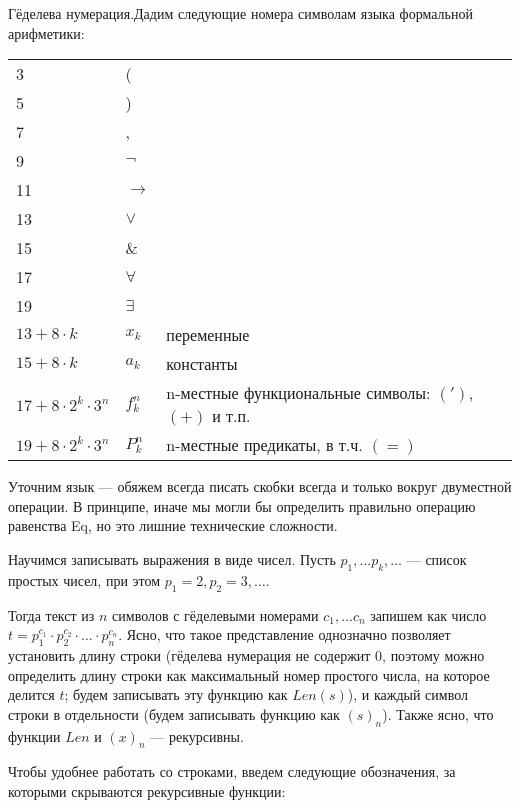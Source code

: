 \begin{definition}{Гёделева нумерация.}Дадим следующие номера символам языка
формальной арифметики:

\begin{tabular}{lll}
3 & (\\
5 & )\\
7 & ,\\
9 & $\neg$ \\
11 & $\rightarrow$ \\
13 & $\vee$ \\
15 & $\&$ \\
17 & $\forall$ \\
19 & $\exists$ \\
$13 + 8\cdot k$ & $x_k$ & переменные\\
$15 + 8\cdot k$ & $a_k$ & константы\\
$17 + 8\cdot 2^k \cdot 3^n$ & $f_k^n$ & n-местные функциональные символы: $(')$, $(+)$ и т.п.\\
$19 + 8\cdot 2^k \cdot 3^n$ & $P_k^n$ & n-местные предикаты, в т.ч. $(=)$
\end{tabular}
\end{definition}

Уточним язык --- обяжем всегда писать скобки всегда и только вокруг двуместной
операции. В принципе, иначе мы могли бы определить правильно операцию равенства Eq,
но это лишние технические сложности.

Научимся записывать выражения в виде чисел. Пусть $p_1, \dots p_k, \dots$ --- список простых
чисел, при этом $p_1 = 2, p_2 = 3, \dots$. 

Тогда текст из $n$ символов с гёделевыми номерами $c_1, \dots c_n$ запишем как число
$t = p_1^{c_1} \cdot p_2^{c_2} \cdot \dots \cdot p_n^{c_n}$. Ясно, что такое представление
однозначно позволяет установить длину строки (гёделева нумерация не содержит 0, поэтому
можно определить длину строки как максимальный номер простого числа, на которое делится $t$;
будем записывать эту функцию как $Len(s)$),
и каждый символ строки в отдельности (будем записывать функцию как $(s)_n$).
Также ясно, что функции $Len$ и $(x)_n$ --- рекурсивны.

Чтобы удобнее работать со строками, введем следующие обозначения, за которыми скрываются
рекурсивные функции:

